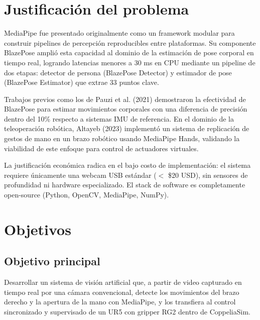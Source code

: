 \section{Justificación del problema}
MediaPipe fue presentado originalmente como un framework modular para construir pipelines de percepción reproducibles entre plataformas. Su componente BlazePose amplió esta capacidad al dominio de la estimación de pose corporal en tiempo real, logrando latencias menores a 30 ms en CPU mediante un pipeline de dos etapas: detector de persona (BlazePose Detector) y estimador de pose (BlazePose Estimator) que extrae 33 puntos clave. \cite{Bazarevskyetal2020} \cite{Lugaresietal2019}

Trabajos previos como los de Pauzi et al. (2021) demostraron la efectividad de BlazePose para estimar movimientos corporales con una diferencia de precisión dentro del 10\% respecto a sistemas IMU de referencia. En el dominio de la teleoperación robótica, Altayeb (2023) implementó un sistema de replicación de gestos de mano en un brazo robótico usando MediaPipe Hands, validando la viabilidad de este enfoque para control de actuadores virtuales. \cite{Pauzietal2021} \cite{Altayeb2023}

La justificación económica radica en el bajo costo de implementación: el sistema requiere únicamente una webcam USB estándar ($<$ \$20 USD), sin sensores de profundidad ni hardware especializado. El stack de software es completamente open-source (Python, OpenCV, MediaPipe, NumPy).

\section{Objetivos}

\subsection{Objetivo principal}
Desarrollar un sistema de visión artificial que, a partir de video capturado en
tiempo real por una cámara convencional, detecte los movimientos del brazo
derecho y la apertura de la mano con MediaPipe, y los transfiera al control
sincronizado y supervisado de un UR5 con gripper RG2 dentro de CoppeliaSim.

